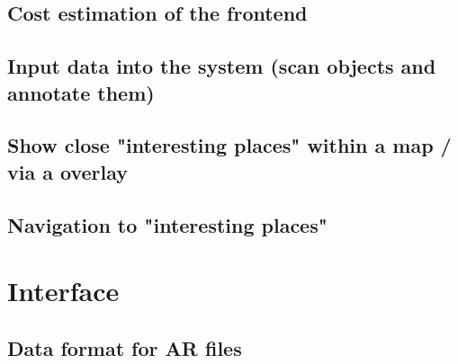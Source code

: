 \subsection{Cost estimation of the frontend}				
  
\subsection{Input data into the system (scan objects and annotate them)} 

\subsection{Show close "interesting places" within a map /  via a overlay} 

\subsection{Navigation to "interesting places"}
				
\section{Interface}							 

\subsection{Data format for \ac{AR} files}